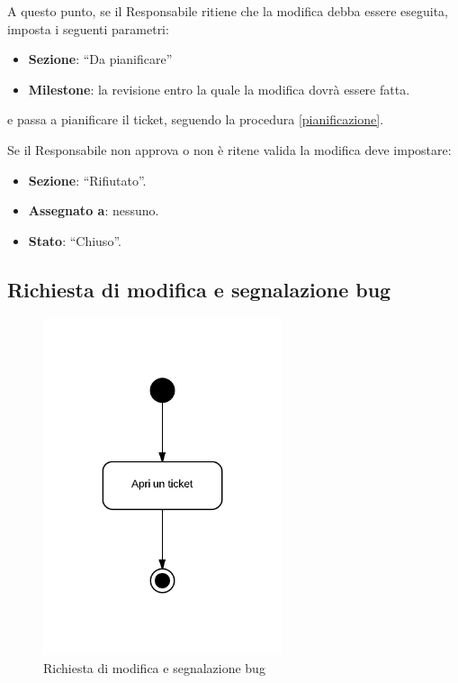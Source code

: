 A questo punto, se il Responsabile ritiene che la modifica debba essere eseguita, imposta i seguenti parametri:
\begin{itemize}
 \item \textbf{Sezione}: ``Da pianificare''
 \item \textbf{Milestone}: la revisione entro la quale la modifica dovrà essere fatta.
\end{itemize}
e passa a pianificare il ticket, seguendo la procedura \ref{pianificazione}.

Se il Responsabile non approva o non è ritene valida la modifica deve impostare:
\begin{itemize}
 \item \textbf{Sezione}: ``Rifiutato''.
 \item \textbf{Assegnato a}: nessuno.
 \item \textbf{Stato}: ``Chiuso''.
\end{itemize}

\subsection{Richiesta di modifica e segnalazione bug}
\label{segnalazionebug}

\begin{figure}[H]
    \centering
    \includegraphics[width=7cm]{uml-processi/Richiesta_di_modifica_e_segnalazione_bug.png}
    \caption{Richiesta di modifica e segnalazione bug}
\end{figure}

